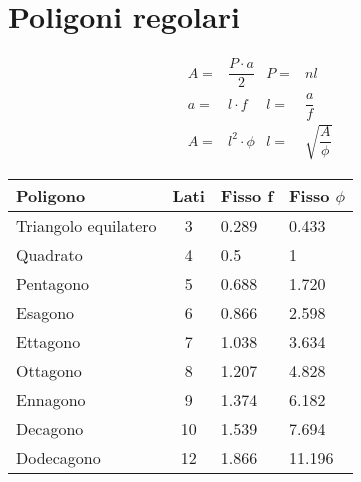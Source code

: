 \section{Poligoni regolari}
\begin{tcolorbox}[sidebyside,righthand width=9cm,colback=white,colframe=white,fonttitle=\bfseries	]
	
	\tcblower
	\begin{align*}
	A=&\dfrac{P\cdot a}{2} & P=&nl	\\
	a=&l\cdot f & l=&\dfrac{a}{f}	\\
	A=&l^2\cdot\phi&l=&\sqrt{\dfrac{A}{\phi}}
	\end{align*}
\end{tcolorbox}
{\centering{}
	\begin{tabular}{lcll}
		\toprule
Poligono	&  Lati&  Fisso f&Fisso $\phi$ \\ 
\midrule
Triangolo equilatero	& 3 & 0.289 &0.433\\ 
Quadrato	& 4 & 0.5&1 \\ 
Pentagono	& 5 &0.688 &1.720 \\ 
Esagono	& 6 &0.866 &2.598 \\ 
Ettagono	& 7 &1.038&3.634 \\ 
Ottagono	& 8 &1.207&4.828 \\ 
Ennagono	& 9&  1.374&6.182\\ 
Decagono	& 10 & 1.539&7.694 \\ 
Dodecagono	&  12&  1.866&11.196\\
\bottomrule
\end{tabular}
\par}
